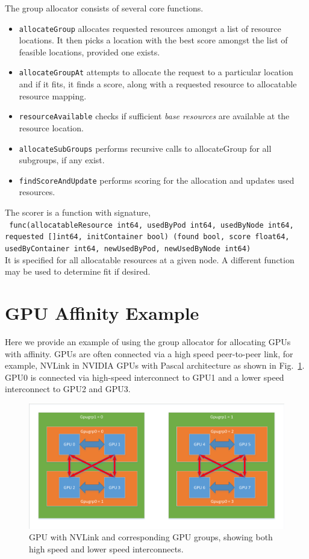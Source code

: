 \documentclass[12pt,onecolumn]{IEEEtran}
\begin{document}
The group allocator consists of several core functions.
\begin{itemize}
\item
\texttt{allocateGroup} allocates requested resources
amongst a list of resource locations.
It then picks a location with the best score amongst the list
of feasible locations, provided one exists.
\item
\texttt{allocateGroupAt} attempts to allocate the request to a particular
location and if it fits, it finds a score, along with a requested
resource to allocatable resource mapping.
\item
\texttt{resourceAvailable} checks if sufficient {\em base resources}
are available at the resource location.
\item
\texttt{allocateSubGroups} performs recursive calls to allocateGroup
for all subgroups, if any exist.
\item
\texttt{findScoreAndUpdate} performs scoring for the allocation and
updates used resources.
\end{itemize}

The scorer is a function with signature, \\
\texttt{
func(allocatableResource int64, usedByPod int64, usedByNode int64, requested []int64, initContainer bool) (found bool, score float64, usedByContainer int64, newUsedByPod, newUsedByNode int64)
} \\
It is specified for all allocatable resources at a given node.
A different function may be used to determine fit if desired.

\section{GPU Affinity Example}

Here we provide an example of using the group allocator for
allocating GPUs with affinity.
GPUs are often connected via a high speed peer-to-peer link, for example,
NVLink in NVIDIA GPUs with Pascal architecture as shown
in Fig.~\ref{fig:gpu}. GPU0 is connected via high-speed interconnect
to GPU1 and a lower speed interconnect to GPU2 and GPU3.

\begin{figure}  
\begin{center}  
\includegraphics[width=6in]{gpu.pdf}
\caption{GPU with NVLink and corresponding GPU groups, showing
both high speed and lower speed interconnects.\label{fig:gpu}}
\end{center}  
\end{figure}
\end{document}
